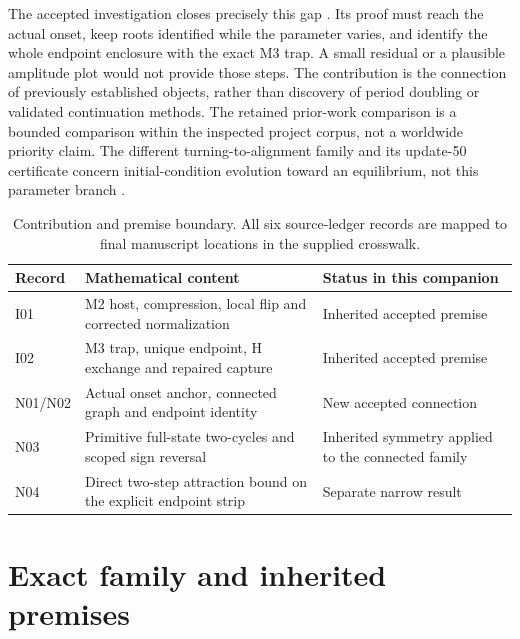 \documentclass[11pt,a4paper]{article}
\numberwithin{equation}{section}
\begin{document}
The accepted investigation closes precisely this gap \cite{AB,Review}. Its proof must reach the actual onset, keep roots identified while the parameter varies, and identify the whole endpoint enclosure with the exact M3 trap. A small residual or a plausible amplitude plot would not provide those steps. The contribution is the connection of previously established objects, rather than discovery of period doubling or validated continuation methods. The retained prior-work comparison is a bounded comparison within the inspected project corpus, not a worldwide priority claim. The different turning-to-alignment family and its update-50 certificate concern initial-condition evolution toward an equilibrium, not this parameter branch \cite{TC}.

\begin{table}[htbp]\centering\small
\begin{tabular}{P{.13\linewidth}P{.48\linewidth}P{.29\linewidth}}\toprule
Record & Mathematical content & Status in this companion\\\midrule
I01 & M2 host, compression, local flip and corrected normalization & Inherited accepted premise\\
I02 & M3 trap, unique endpoint, H exchange and repaired capture & Inherited accepted premise\\
N01/N02 & Actual onset anchor, connected graph and endpoint identity & New accepted connection\\
N03 & Primitive full-state two-cycles and scoped sign reversal & Inherited symmetry applied to the connected family\\
N04 & Direct two-step attraction bound on the explicit endpoint strip & Separate narrow result\\\bottomrule
\end{tabular}
\caption{Contribution and premise boundary. All six source-ledger records are mapped to final manuscript locations in the supplied crosswalk.}\label{tab:contributions}
\end{table}

\section{Exact family and inherited premises}\label{sec:family}
\end{document}
